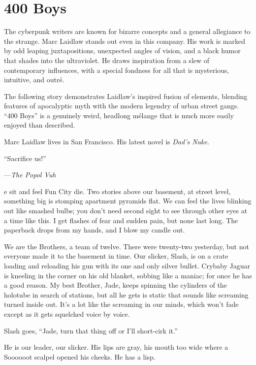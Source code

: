\chapter{400 Boys}

The cyberpunk writers are known for bizarre concepts and a general allegiance to the strange. Marc Laidlaw stands out even in this company. His work is marked by odd leaping juxtapositions, unexpected angles of vision, and a black humor that shades into the ultraviolet. He draws inspiration from a slew of contemporary influences, with a special fondness for all that is mysterious, intuitive, and outré.

The following story demonstrates Laidlaw's inspired fusion of elements, blending features of apocalyptic myth with the modern legendry of urban street gangs. ``400 Boys'' is a genuinely weird, headlong mélange that is much more easily enjoyed than described.

Marc Laidlaw lives in San Francisco. His latest novel is \textit{Dad's Nuke}.

\hrulefill

``Sacrifice us!''

---\textit{The Popol Vuh}
 
e sit and feel Fun City die. Two stories above our basement, at street level, something big is stomping apartment pyramids flat. We can feel the lives blinking out like smashed bulbs; you don't need second sight to see through other eyes at a time like this. I get flashes of fear and sudden pain, but none last long. The paperback drops from my hands, and I blow my candle out.

We are the Brothers, a team of twelve. There were twenty-two yesterday, but not everyone made it to the basement in time. Our slicker, Slash, is on a crate loading and reloading his gun with its one and only silver bullet. Crybaby Jaguar is kneeling in the corner on his old blanket, sobbing like a maniac; for once he has a good reason. My best Brother, Jade, keeps spinning the cylinders of the holotube in search of stations, but all he gets is static that sounds like screaming turned inside out. It's a lot like the screaming in our minds, which won't fade except as it gets squelched voice by voice.

Slash goes, ``Jade, turn that thing off or I'll short-cirk it.''

He is our leader, our slicker. His lips are gray, his mouth too wide where a Soooooot scalpel opened his cheeks. He has a lisp.

